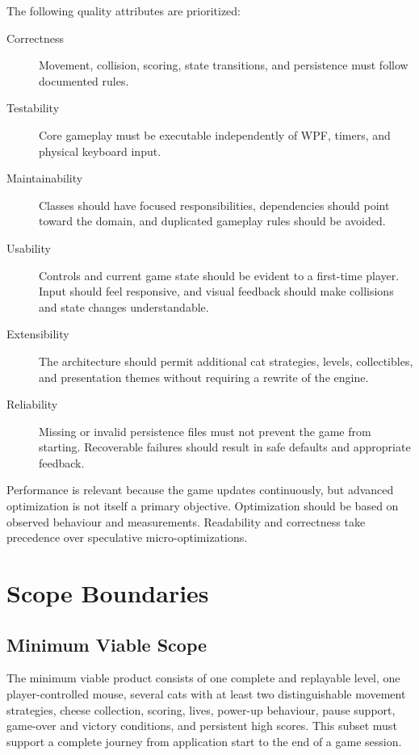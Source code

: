 The following quality attributes are prioritized:

\begin{description}
	\item[Correctness] Movement, collision, scoring, state transitions, and persistence must follow documented rules.

	\item[Testability] Core gameplay must be executable independently of WPF, timers, and physical keyboard input.

	\item[Maintainability] Classes should have focused responsibilities, dependencies should point toward the domain, and duplicated gameplay rules should be avoided.

	\item[Usability] Controls and current game state should be evident to a first-time player. Input should feel responsive, and visual feedback should make collisions and state changes understandable.

	\item[Extensibility] The architecture should permit additional cat strategies, levels, collectibles, and presentation themes without requiring a rewrite of the engine.

	\item[Reliability] Missing or invalid persistence files must not prevent the game from starting. Recoverable failures should result in safe defaults and appropriate feedback.
\end{description}

Performance is relevant because the game updates continuously, but advanced optimization is not itself a primary objective. Optimization should be based on observed behaviour and measurements. Readability and correctness take precedence over speculative micro-optimizations.

\section{Scope Boundaries}

\subsection{Minimum Viable Scope}

The minimum viable product consists of one complete and replayable level, one player-controlled mouse, several cats with at least two distinguishable movement strategies, cheese collection, scoring, lives, power-up behaviour, pause support, game-over and victory conditions, and persistent high scores. This subset must support a complete journey from application start to the end of a game session.

